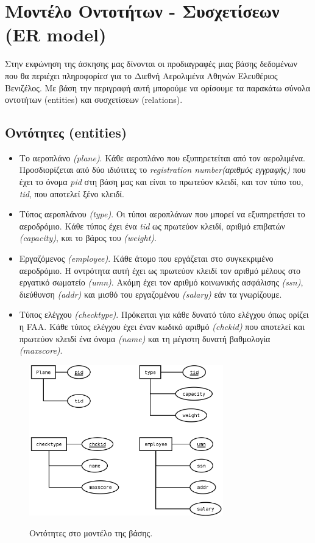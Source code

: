 \documentclass[a4paper]{article}
\begin{document}

\newcommand{\tab}{\hspace*{3em}}

\section{Μοντέλο Οντοτήτων - Συσχετίσεων (ER model)}
Στην εκφώνηση της άσκησης μας δίνονται οι προδιαγραφές μιας βάσης δεδομένων που θα περιέχει
πληροφορίεσ για το Διεθνή Αερολιμένα Αθηνών Ελευθέριος Βενιζέλος. Με βάση την
περιγραφή αυτή μπορούμε να ορίσουμε τα παρακάτω σύνολα οντοτήτων (entities)
και συσχετίσεων (relations).

\subsection{Οντότητες (entities)}
\begin{itemize}
\item Το αεροπλάνο \emph{(plane)}. Κάθε αεροπλάνο που εξυπηρετείται από τον αερολιμένα.
Προσδιορίζεται από δύο ιδιότιτες το \emph{registration number(αριθμός
εγγραφής)} που έχει το όνομα \emph{pid} στη βάση μας και είναι το πρωτεύον
κλειδί, και τον τύπο του, \emph{tid}, που αποτελεί ξένο κλειδί.
\item Τύπος αεροπλάνου \emph{(type)}. Οι τύποι αεροπλάνων που μπορεί να εξυπηρετήσει το
αεροδρόμιο. Κάθε τύπος έχει ένα \emph{tid} ως πρωτεύον κλειδί, αριθμό επιβατών
\emph{(capacity)}, και το βάρος του \emph{(weight)}.
\item Εργαζόμενος \emph{(employee)}. Κάθε άτομο που εργάζεται στο συγκεκριμένο αεροδρόμιο. Η
οντρότητα αυτή έχει ως πρωτεύον κλειδί τον αριθμό μέλους στο εργατικό
σωματείο \emph{(umn)}. Ακόμη έχει τον αριθμό κοινωνικής ασφάλισης \emph{(ssn)},
διεύθυνση \emph{(addr)} και μισθό του εργαζομένου \emph{(salary)} εάν τα γνωρίζουμε.
\item Τύπος ελέγχου \emph{(checktype)}. Πρόκειται για κάθε δυνατό τύπο ελέγχου όπως
ορίζει η FAA. Κάθε τύπος ελέγχου έχει έναν κωδικό αριθμό \emph{(chckid)} που
αποτελεί και πρωτεύον κλειδί ένα όνομα \emph{(name)} και τη μέγιστη δυνατή
βαθμολογία \emph{(maxscore)}.
\end{itemize}
\begin{figure}[h]
\centering
\includegraphics[width=0.75\textwidth]{../../ER_model/aviation_entities.png}\\
\caption{Οντότητες στο μοντέλο της βάσης.}
\end{figure}
\end{document}
